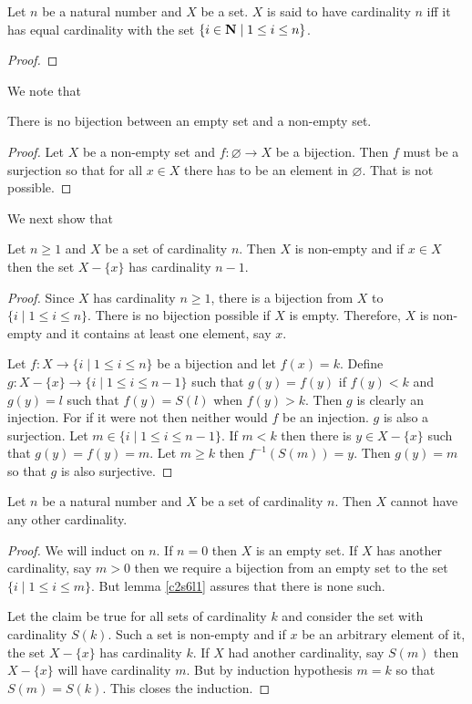 \begin{defn}\label{c2s6d2}
Let $n$ be a natural number and $X$ be a set. $X$ is said to have 
cardinality $n$ iff it has equal cardinality with the set $\{i \in \mathbf{N} 
\;|\; 1 \le i \le n\}$.
\end{defn}
\begin{proof}
\end{proof}

We note that
\begin{lem}\label{c2s6l1}
There is no bijection between an empty set and a non-empty set.
\end{lem}
\begin{proof}
Let $X$ be a non-empty set and $f:\varnothing \rightarrow X$ be a 
bijection. Then $f$ must be a surjection so that for all $x \in X$ there 
has to be an element in $\varnothing$. That is not possible.
\end{proof}

We next show that
\begin{lem}\label{c2s6l2}
Let $n \ge 1$ and $X$ be a set of cardinality $n$. Then $X$ is non-empty 
and if $x \in X$ then the set $X - \{x\}$ has cardinality $n - 1$.
\end{lem}
\begin{proof}
Since $X$ has cardinality $n \ge 1$, there is a bijection from $X$ to 
$\{i\;|\; 1 \le i \le n\}$. There is no bijection possible if $X$ is empty.
Therefore, $X$ is non-empty and it contains at least one element, say $x$.

Let $f: X \rightarrow \{i \;|\; 1 \le i \le n\}$ be a bijection and let 
$f(x) = k$. Define $g: X - \{x\} \rightarrow \{i \;|\; 1 \le i \le n - 1\}$
such that $g(y) = f(y)$ if $f(y) < k$ and $g(y) = l$ such that $f(y) = 
S(l)$ when $f(y) > k$. Then $g$ is clearly an injection. For if it were 
not then neither would $f$ be an injection. $g$ is also a surjection. Let 
$m \in \{i \;|\; 1 \le i \le n - 1\}$. If $m < k$ then there is $y \in X -
\{x\}$ such that $g(y) = f(y) = m$. Let $m \ge k$ then $f^{-1}(S(m)) = y$. 
Then $g(y) = m$ so that $g$ is also surjective.
\end{proof}

\begin{prop}\label{c2s6p2}
Let $n$ be a natural number and $X$ be a set of cardinality $n$. Then $X$ 
cannot have any other cardinality.
\end{prop}
\begin{proof}
We will induct on $n$. If $n = 0$ then $X$ is an empty set. If $X$ has 
another cardinality, say $m > 0$ then we require a bijection from an empty 
set to the set $\{i \;|\; 1 \le i \le m\}$. But lemma \ref{c2s6l1} assures 
that there is none such.

Let the claim be true for all sets of cardinality $k$ and consider the set 
with cardinality $S(k)$. Such a set is non-empty and if $x$ be an arbitrary
element of it, the set $X - \{x\}$ has cardinality $k$. If $X$ had another 
cardinality, say $S(m)$ then $X - \{x\}$ will have cardinality $m$. But by 
induction hypothesis $m = k$ so that $S(m) = S(k)$. This closes the 
induction.
\end{proof}

